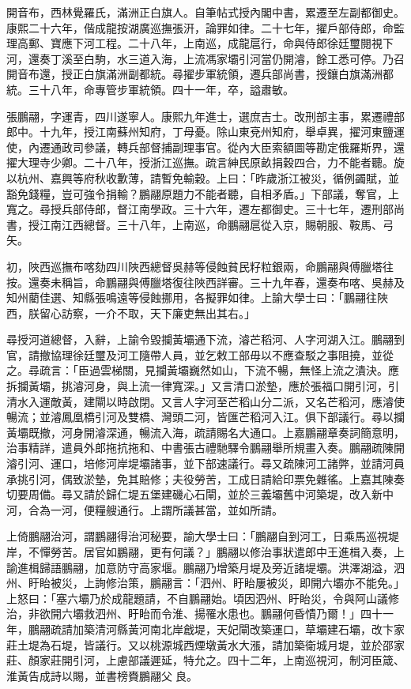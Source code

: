 \begin{pinyinscope}
開音布，西林覺羅氏，滿洲正白旗人。自筆帖式授內閣中書，累遷至左副都御史。康熙二十六年，偕成龍按湖廣巡撫張汧，論罪如律。二十七年，擢戶部侍郎，命監理高郵、寶應下河工程。二十八年，上南巡，成龍扈行，命與侍郎徐廷璽閱視下河，還奏丁溪至白駒，水三道入海，上流馮家壩引河當仍開濬，餘工悉可停。乃召開音布還，授正白旗滿洲副都統。尋擢步軍統領，遷兵部尚書，授鑲白旗滿洲都統。三十八年，命專管步軍統領。四十一年，卒，謚肅敏。

張鵬翮，字運青，四川遂寧人。康熙九年進士，選庶吉士。改刑部主事，累遷禮部郎中。十九年，授江南蘇州知府，丁母憂。除山東兗州知府，舉卓異，擢河東鹽運使，內遷通政司參議，轉兵部督捕副理事官。從內大臣索額圖等勘定俄羅斯界，還擢大理寺少卿。二十八年，授浙江巡撫。疏言紳民原畝捐穀四合，力不能者聽。旋以杭州、嘉興等府秋收歉薄，請暫免輸穀。上曰：「昨歲浙江被災，循例蠲賦，並豁免錢糧，豈可強令捐輸？鵬翮原題力不能者聽，自相矛盾。」下部議，奪官，上寬之。尋授兵部侍郎，督江南學政。三十六年，遷左都御史。三十七年，遷刑部尚書，授江南江西總督。三十八年，上南巡，命鵬翮扈從入京，賜朝服、鞍馬、弓矢。

初，陜西巡撫布喀劾四川陜西總督吳赫等侵蝕貧民籽粒銀兩，命鵬翮與傅臘塔往按。還奏未稱旨，命鵬翮與傅臘塔復往陜西詳審。三十九年春，還奏布喀、吳赫及知州藺佳選、知縣張鳴遠等侵蝕挪用，各擬罪如律。上諭大學士曰：「鵬翮往陜西，朕留心訪察，一介不取，天下廉吏無出其右。」

尋授河道總督，入辭，上諭令毀攔黃壩通下流，濬芒稻河、人字河湖入江。鵬翮到官，請撤協理徐廷璽及河工隨帶人員，並乞敕工部毋以不應查駁之事阻撓，並從之。尋疏言：「臣過雲梯關，見攔黃壩巍然如山，下流不暢，無怪上流之潰決。應拆攔黃壩，挑濬河身，與上流一律寬深。」又言清口淤墊，應於張福口開引河，引清水入運敵黃，建閘以時啟閉。又言人字河至芒稻山分二派，又名芒稻河，應濬使暢流；並濬鳳凰橋引河及雙橋、灣頭二河，皆匯芒稻河入江。俱下部議行。尋以攔黃壩既撤，河身開濬深通，暢流入海，疏請賜名大通口。上嘉鵬翮章奏詞簡意明，治事精詳，遣員外郎拖抗拖和、中書張古禮馳驛令鵬翮舉所規畫入奏。鵬翮疏陳開濬引河、運口，培修河岸堤壩諸事，並下部速議行。尋又疏陳河工諸弊，並請河員承挑引河，偶致淤墊，免其賠修；夫役勞苦，工成日請給印票免雜徭。上嘉其陳奏切要周備。尋又請於歸仁堤五堡建磯心石閘，並於三義壩舊中河築堤，改入新中河，合為一河，便糧艘通行。上謂所議甚當，並如所請。

上倚鵬翮治河，謂鵬翮得治河秘要，諭大學士曰：「鵬翮自到河工，日乘馬巡視堤岸，不憚勞苦。居官如鵬翮，更有何議？」鵬翮以修治事狀遣郎中王進楫入奏，上諭進楫歸語鵬翮，加意防守高家堰。鵬翮乃增築月堤及旁近諸堤壩。洪澤湖溢，泗州、盱眙被災，上詢修治策，鵬翮言：「泗州、盱眙屢被災，即開六壩亦不能免。」上怒曰：「塞六壩乃於成龍題請，不自鵬翮始。頃因泗州、盱眙災，令與阿山議修治，非欲開六壩救泗州、盱眙而令淮、揚罹水患也。鵬翮何昏憒乃爾！」四十一年，鵬翮疏請加築清河縣黃河南北岸戧堤，天妃閘改築運口，草壩建石壩，改卞家莊土堤為石堤，皆議行。又以桃源城西煙墩黃水大漲，請加築衛城月堤，並於邵家莊、顏家莊開引河，上慮部議遲延，特允之。四十二年，上南巡視河，制河臣箴、淮黃告成詩以賜，並書榜賚鵬翮父良。


\end{pinyinscope}
